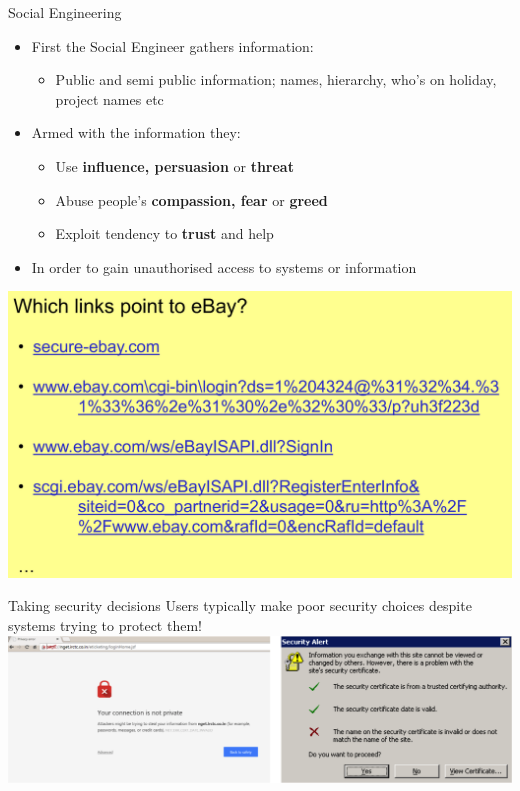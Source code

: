 \documentclass{beamer}
\begin{document}
\begin{frame}{Social Engineering}
  \begin{itemize}
    \item First the Social Engineer gathers information:
    \begin{itemize}
    	\item Public and semi public information; names, hierarchy, who's on holiday, project names etc
    \end{itemize}
    \item Armed with the information they:
     \begin{itemize}
    	\item Use \textbf{influence, persuasion} or \textbf{threat}
        \item Abuse people's \textbf{compassion, fear} or \textbf{greed}
        \item Exploit tendency to \textbf{trust} and help
    \end{itemize}
   	\item In order to gain unauthorised access to systems or information
  \end{itemize}
\end{frame}

\begin{frame}
\begin{center}
\includegraphics[width=0.9\linewidth]{ebay.png}
\end{center}
\end{frame}

\begin{frame}{Taking security decisions}
Users typically make poor security choices despite systems trying to protect them!
\includegraphics[width=1\linewidth]{security-decisions.png}
\end{frame}
\end{document}
